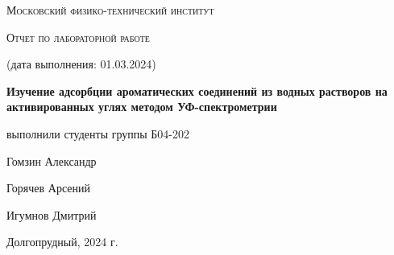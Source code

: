 \documentclass[a4paper]{article}
\begin{document}
\begin{titlepage}
	\centering
	\vspace{5cm}
	{\scshape\LARGE Московский физико-технический институт \par}
	\vspace{4cm}
	{\scshape\Large Отчет по лабораторной работе \par (дата выполнения: 01.03.2024) \par}
	\vspace{1cm}
	{\huge\bfseries Изучение адсорбции ароматических соединений из водных растворов на активированных углях методом УФ-спектрометрии \par}
	\vspace{1cm}
	\vfill
\begin{flushright}
	{\large выполнили студенты группы Б04-202}\par
	\vspace{0.3cm}
	{\LARGE Гомзин Александр} \par
		\vspace{0.3cm}
	{\LARGE Горячев Арсений} \par
        \vspace{0.3cm}
        {\LARGE Игумнов Дмитрий} \par
\end{flushright}
	

	\vfill

	Долгопрудный, 2024 г.
\end{titlepage}

	\thispagestyle{empty}


	\newpage \LARGE
	
		\tableofcontents %
	
\end{document}
